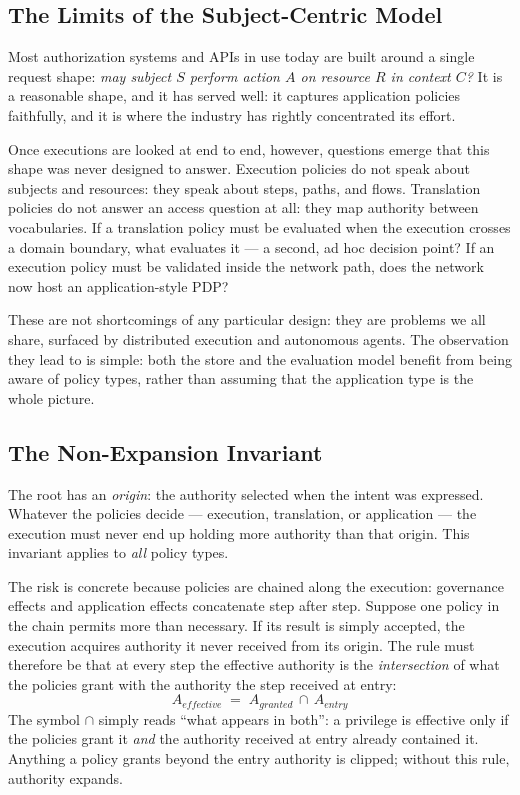 \documentclass[11pt,a4paper]{article}
\newcommand{\term}[1]{\emph{#1}}                 %
\begin{document}
\subsection{The Limits of the Subject-Centric Model}

Most authorization systems and APIs in use today are built around a
single request shape: \emph{may subject $S$ perform action $A$ on
resource $R$ in context $C$?} It is a reasonable shape, and it has served
well: it captures application policies faithfully, and it is where the
industry has rightly concentrated its effort.

Once executions are looked at end to end, however, questions emerge that
this shape was never designed to answer. Execution policies do not speak
about subjects and resources: they speak about steps, paths, and flows.
Translation policies do not answer an access question at all: they map
authority between vocabularies. If a translation policy must be evaluated
when the execution crosses a domain boundary, what evaluates it --- a
second, ad hoc decision point? If an execution policy must be validated
inside the network path, does the network now host an application-style
PDP?

These are not shortcomings of any particular design: they are problems we
all share, surfaced by distributed execution and autonomous agents. The
observation they lead to is simple: both the store and the evaluation
model benefit from being aware of policy types, rather than assuming that
the application type is the whole picture.

\subsection{The Non-Expansion Invariant}

The root has an \term{origin}: the authority selected when the intent was
expressed. Whatever the policies decide --- execution, translation, or
application --- the execution must never end up holding more authority
than that origin. This invariant applies to \emph{all} policy types.

The risk is concrete because policies are chained along the execution:
governance effects and application effects concatenate step after step.
Suppose one policy in the chain permits more than necessary. If its
result is simply accepted, the execution acquires authority it never
received from its origin. The rule must therefore be that at every step
the effective authority is the \emph{intersection} of what the policies
grant with the authority the step received at entry:
\[
A_{\mathit{effective}} \;=\; A_{\mathit{granted}} \,\cap\, A_{\mathit{entry}}
\]
The symbol $\cap$ simply reads ``what appears in both'': a privilege is
effective only if the policies grant it \emph{and} the authority received
at entry already contained it. Anything a policy grants beyond the entry
authority is clipped; without this rule, authority expands.
\end{document}
